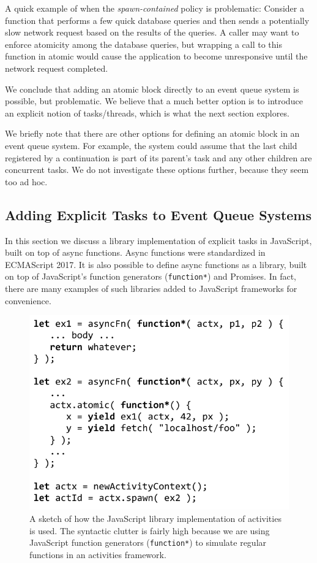 \documentclass[sigplan,10pt,review,anonymous]{acmart}\settopmatter{printfolios=true,printccs=false,printacmref=false}
\begin{document}
A quick example of when the \emph{spawn-contained} policy is problematic:
Consider a function that performs a few quick database queries and then sends a potentially slow network request based on the results of the queries.
A caller may want to enforce atomicity among the database queries, but wrapping a call to this function in atomic would cause the application to become unresponsive until the network request completed.

We conclude that adding an atomic block directly to an event queue system is possible, but problematic.
We believe that a much better option is to introduce an explicit notion of tasks/threads, which is what the next section explores.

We briefly note that there are other options for defining an atomic block in an event queue system.
For example, the system could assume that the last child registered by a continuation is part of its parent's task and any other children are concurrent tasks.
We do not investigate these options further, because they seem too ad hoc.

\subsection{Adding Explicit Tasks to Event Queue Systems}

In this section we discuss a library implementation of explicit tasks in JavaScript, built on top of async functions.
Async functions were standardized in ECMAScript 2017.
It is also possible to define async functions as a library, built on top of JavaScript's function generators (\texttt{function*}) and Promises.
In fact, there are many examples of such libraries added to JavaScript frameworks for convenience.

\begin{figure}
\includegraphics[scale=0.65]{trivial_js}
\caption{A sketch of how the JavaScript library implementation of activities is used.
The syntactic clutter is fairly high because we are using JavaScript function generators (\texttt{function*}) to simulate regular functions in an activities framework.}
\label{fig:trivial_js}
\end{figure}
\end{document}
